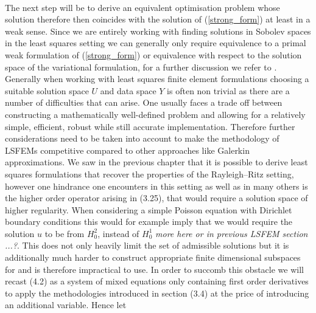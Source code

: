 \documentclass[../draft_1.tex]{subfiles}
\begin{document}
\smallskip
\\
The next step will be to derive an equivalent optimisation problem whose solution therefore then coincides with the solution of (\ref{strong_form}) at least in a weak sense. Since we are entirely working with finding solutions in Sobolev spaces in the least squares setting we can generally only require equivalence to a primal weak formulation of (\ref{strong_form}) or equivalence with respect to the solution space of the variational formulation, for a further discussion we refer to \cite{bochev2009least}. Generally when working with least squares finite element formulations choosing a suitable solution space $U$ and data space $Y$ is often non trivial as there are a number of difficulties that can arise. One usually faces a trade off between constructing a mathematically well-defined problem and allowing for a relatively simple, efficient, robust while still accurate implementation. Therefore further considerations need to be taken into account to make the methodology of LSFEMs competitive compared to other approaches like Galerkin approximations. We saw in the previous chapter that it is possible to derive least squares formulations that recover the properties of the Rayleigh--Ritz setting, however one hindrance one encounters in this setting as well as in many others is the higher order operator arising in (3.25), that would require a solution space of higher regularity. When considering a simple Poisson equation with Dirichlet boundary conditions this would for example imply that we would require the solution $u$ to be from $H_0^2$, instead of $H_0^1$ \cite{bochev2009least} \textit{more here or in previous LSFEM section ...?}. This does not only heavily limit the set of admissible solutions but it is additionally much harder to construct appropriate finite dimensional subspaces for and is therefore impractical to use. In order to succomb this obstacle we will recast (4.2) as a system of mixed equations only containing first order derivatives to apply the methodologies introduced in section (3.4) at the price of introducing an additional variable. Hence let
\end{document}
